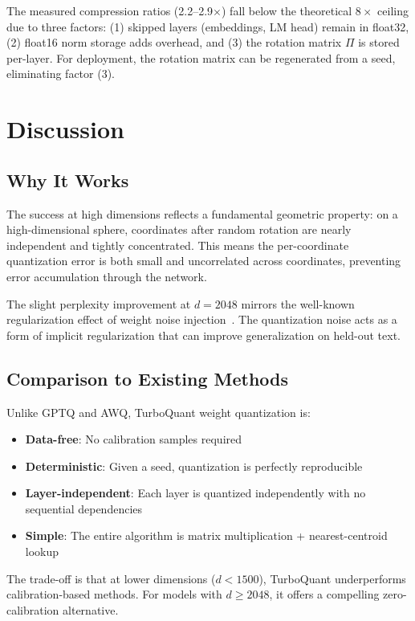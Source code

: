 \documentclass[11pt,twocolumn,letterpaper]{article}
\begin{document}
The measured compression ratios (2.2--2.9$\times$) fall below the theoretical $8\times$ ceiling due to three factors: (1) skipped layers (embeddings, LM head) remain in float32, (2) float16 norm storage adds overhead, and (3) the rotation matrix $\Pi$ is stored per-layer. For deployment, the rotation matrix can be regenerated from a seed, eliminating factor (3).

\section{Discussion}

\subsection{Why It Works}

The success at high dimensions reflects a fundamental geometric property: on a high-dimensional sphere, coordinates after random rotation are nearly independent and tightly concentrated. This means the per-coordinate quantization error is both small and uncorrelated across coordinates, preventing error accumulation through the network.

The slight perplexity improvement at $d = 2048$ mirrors the well-known regularization effect of weight noise injection~\cite{neelakantan2017adding}. The quantization noise acts as a form of implicit regularization that can improve generalization on held-out text.

\subsection{Comparison to Existing Methods}

Unlike GPTQ and AWQ, TurboQuant weight quantization is:
\begin{itemize}
\item \textbf{Data-free}: No calibration samples required
\item \textbf{Deterministic}: Given a seed, quantization is perfectly reproducible
\item \textbf{Layer-independent}: Each layer is quantized independently with no sequential dependencies
\item \textbf{Simple}: The entire algorithm is matrix multiplication + nearest-centroid lookup
\end{itemize}

The trade-off is that at lower dimensions ($d < 1500$), TurboQuant underperforms calibration-based methods. For models with $d \geq 2048$, it offers a compelling zero-calibration alternative.
\end{document}
